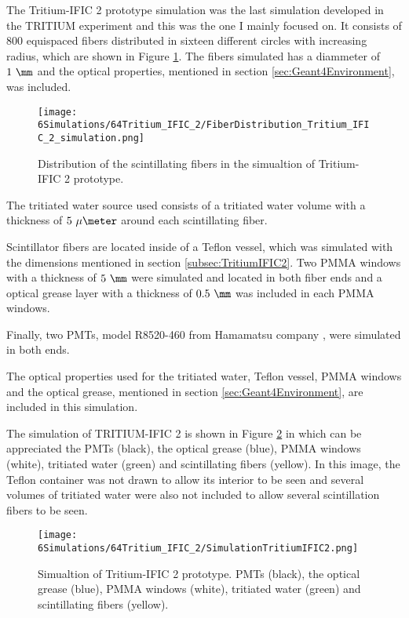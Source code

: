The Tritium-IFIC 2 prototype simulation was the last simulation developed in the TRITIUM experiment and this was the one I mainly focused on. It consists of $800$ equispaced fibers distributed in sixteen different circles with increasing radius, which are shown in Figure \ref{fig:FibersTritiumIFIC2Simulation}. The fibers simulated has a diammeter of $1~\mm$ and the optical properties, mentioned in section \ref{sec:Geant4Environment}, was included.

\begin{figure}[h]
\centering
\texttt{[image: 6Simulations/64Tritium\_IFIC\_2/FiberDistribution\_Tritium\_IFIC\_2\_simulation.png]}
\caption{Distribution of the scintillating fibers in the simualtion of Tritium-IFIC 2 prototype.\label{fig:FibersTritiumIFIC2Simulation}}
\end{figure}

The tritiated water source used consists of a tritiated water volume with a thickness of $5~\mu\meter$ around each scintillating fiber.

Scintillator fibers are located inside of a Teflon vessel, which was simulated with the dimensions mentioned in section \ref{subsec:TritiumIFIC2}. Two PMMA windows with a thickness of $5~\mm$ were simulated and located in both fiber ends and a optical grease layer with a thickness of $0.5~\mm$ was included in each PMMA windows.

Finally, two PMTs, model R8520-460 from Hamamatsu company \cite{DataSheetPMTs}, were simulated in both ends. 

The optical properties used for the tritiated water, Teflon vessel, PMMA windows and the optical grease, mentioned in section \ref{sec:Geant4Environment}, are included in this simulation. 

The simulation of TRITIUM-IFIC 2 is shown in Figure \ref{fig:TritiumIFIC2Simulation} in which can be appreciated the PMTs (black), the optical grease (blue), PMMA windows (white), tritiated water (green) and scintillating fibers (yellow). In this image, the Teflon container was not drawn to allow its interior to be seen and several volumes of tritiated water were also not included to allow several scintillation fibers to be seen.

\begin{figure}[h]
\centering
\texttt{[image: 6Simulations/64Tritium\_IFIC\_2/SimulationTritiumIFIC2.png]}
\caption{Simualtion of Tritium-IFIC 2 prototype. PMTs (black), the optical grease (blue), PMMA windows (white), tritiated water (green) and scintillating fibers (yellow). \label{fig:TritiumIFIC2Simulation}}
\end{figure}

